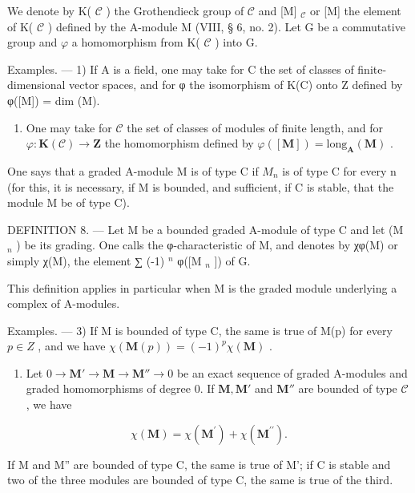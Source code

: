 We denote by K( \(\mathcal{C}\) ) the Grothendieck group of \(\mathcal{C}\) and {[}M{]} \(_{\mathcal{C}}\) or {[}M{]} the element of K( \(\mathcal{C}\) ) defined by the A-module M (VIII, § 6, no. 2). Let G be a commutative group and \(\varphi\) a homomorphism from K( \(\mathcal{C}\) ) into G.

Examples. --- 1) If A is a field, one may take for C the set of classes of finite-dimensional vector spaces, and for φ the isomorphism of K(C) onto Z defined by φ({[}M{]}) = dim (M).

\begin{enumerate}
\def\labelenumi{\arabic{enumi})}
\setcounter{enumi}{1}
\tightlist
\item
  One may take for \(\mathcal{C}\) the set of classes of modules of finite length, and for \(\varphi: \mathbf{K}(\mathcal{C}) \to \mathbf{Z}\) the homomorphism defined by \(\varphi([\mathbf{M}]) = \text{long}_{\mathbf{A}}(\mathbf{M})\) .
\end{enumerate}

One says that a graded A-module M is of type C if \(M_{n}\) is of type C for every n (for this, it is necessary, if M is bounded, and sufficient, if C is stable, that the module M be of type C).

DEFINITION 8. --- Let M be a bounded graded A-module of type C and let (M \(_{n}\) ) be its grading. One calls the φ-characteristic of M, and denotes by χφ(M) or simply χ(M), the element ∑ (-1) \(^{n}\) φ({[}M \(_{n}\) {]}) of G.

This definition applies in particular when M is the graded module underlying a complex of A-modules.

Examples. --- 3) If M is bounded of type C, the same is true of M(p) for every \(p \in Z\) , and we have \(\chi(\mathbf{M}(p)) = (-1)^{p} \chi(\mathbf{M})\) .

\begin{enumerate}
\def\labelenumi{\arabic{enumi})}
\setcounter{enumi}{3}
\tightlist
\item
  Let \(0 \to \mathbf{M}' \to \mathbf{M} \to \mathbf{M}'' \to 0\) be an exact sequence of graded A-modules and graded homomorphisms of degree 0. If \(\mathbf{M}, \mathbf{M}'\) and \(\mathbf{M}''\) are bounded of type \(\mathcal{C}\) , we have
\end{enumerate}

\[
\chi (\mathbf {M}) = \chi (\mathbf {M} ^ {\prime}) + \chi (\mathbf {M} ^ {\prime \prime}).
\]

If M and M'' are bounded of type C, the same is true of M'; if C is stable and two of the three modules are bounded of type C, the same is true of the third.

